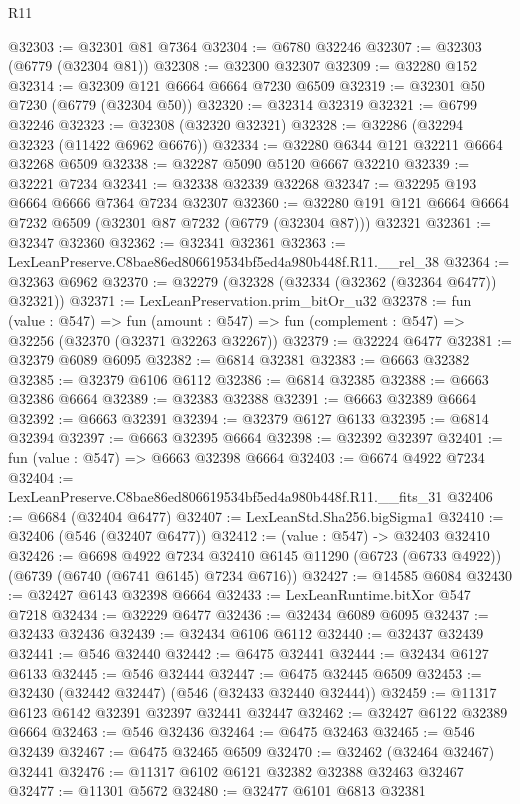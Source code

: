 \begin{lexlean}{R11}
\begin{coremodule}
@32303 := @32301 @81 @7364
@32304 := @6780 @32246
@32307 := @32303 (@6779 (@32304 @81))
@32308 := @32300 @32307
@32309 := @32280 @152
@32314 := @32309 @121 @6664 @6664 @7230 @6509
@32319 := @32301 @50 @7230 (@6779 (@32304 @50))
@32320 := @32314 @32319
@32321 := @6799 @32246
@32323 := @32308 (@32320 @32321)
@32328 := @32286 (@32294 @32323 (@11422 @6962 @6676))
@32334 := @32280 @6344 @121 @32211 @6664 @32268 @6509
@32338 := @32287 @5090 @5120 @6667 @32210
@32339 := @32221 @7234
@32341 := @32338 @32339 @32268
@32347 := @32295 @193 @6664 @6666 @7364 @7234 @32307
@32360 := @32280 @191 @121 @6664 @6664 @7232 @6509 (@32301 @87 @7232 (@6779 (@32304 @87))) @32321
@32361 := @32347 @32360
@32362 := @32341 @32361
@32363 := LexLeanPreserve.C8bae86ed806619534bf5ed4a980b448f.R11.__rel_38
@32364 := @32363 @6962
@32370 := @32279 (@32328 (@32334 (@32362 (@32364 @6477)) @32321))
@32371 := LexLeanPreservation.prim_bitOr_u32
@32378 := fun (value : @547) =>
  fun (amount : @547) => fun (complement : @547) => @32256 (@32370 (@32371 @32263 @32267))
@32379 := @32224 @6477
@32381 := @32379 @6089 @6095
@32382 := @6814 @32381
@32383 := @6663 @32382
@32385 := @32379 @6106 @6112
@32386 := @6814 @32385
@32388 := @6663 @32386 @6664
@32389 := @32383 @32388
@32391 := @6663 @32389 @6664
@32392 := @6663 @32391
@32394 := @32379 @6127 @6133
@32395 := @6814 @32394
@32397 := @6663 @32395 @6664
@32398 := @32392 @32397
@32401 := fun (value : @547) => @6663 @32398 @6664
@32403 := @6674 @4922 @7234
@32404 := LexLeanPreserve.C8bae86ed806619534bf5ed4a980b448f.R11.__fits_31
@32406 := @6684 (@32404 @6477)
@32407 := LexLeanStd.Sha256.bigSigma1
@32410 := @32406 (@546 (@32407 @6477))
@32412 := (value : @547) -> @32403 @32410
@32426 := @6698
    @4922
    @7234
    @32410
    @6145
    @11290
    (@6723 (@6733 @4922))
    (@6739 (@6740 (@6741 @6145) @7234 @6716))
@32427 := @14585 @6084
@32430 := @32427 @6143 @32398 @6664
@32433 := LexLeanRuntime.bitXor @547 @7218
@32434 := @32229 @6477
@32436 := @32434 @6089 @6095
@32437 := @32433 @32436
@32439 := @32434 @6106 @6112
@32440 := @32437 @32439
@32441 := @546 @32440
@32442 := @6475 @32441
@32444 := @32434 @6127 @6133
@32445 := @546 @32444
@32447 := @6475 @32445 @6509
@32453 := @32430 (@32442 @32447) (@546 (@32433 @32440 @32444))
@32459 := @11317 @6123 @6142 @32391 @32397 @32441 @32447
@32462 := @32427 @6122 @32389 @6664
@32463 := @546 @32436
@32464 := @6475 @32463
@32465 := @546 @32439
@32467 := @6475 @32465 @6509
@32470 := @32462 (@32464 @32467) @32441
@32476 := @11317 @6102 @6121 @32382 @32388 @32463 @32467
@32477 := @11301 @5672
@32480 := @32477 @6101 @6813 @32381

\end{coremodule}
\end{lexlean}

